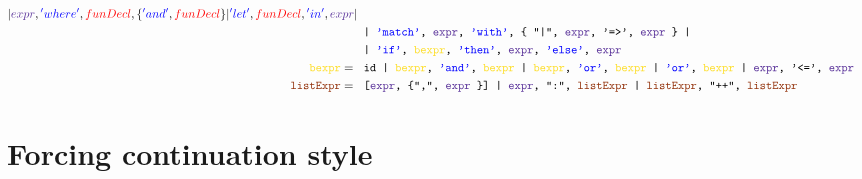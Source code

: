 \documentclass{article}
\begin{document}
\begin{align*}
{	| \color{RoyalPurple}expr\color{black}, \color{blue}'where'\color{black}, \color{red} funDecl\color{black}, \{ \color{blue}'and'\color{black}, \color{red}funDecl \color{black} \} 
	| \color{blue}'let'\color{black}, \color{red}funDecl\color{black}, \color{blue}'in'\color{black}, \color{RoyalPurple}expr \color{black} 
|}\\
&\texttt{
	| \color{blue}'match'\color{black}, \color{RoyalPurple}expr\color{black}, \color{blue}'with'\color{black}, \{ "|", \color{RoyalPurple}expr\color{black}, '=>', \color{RoyalPurple}expr \color{black} \}
|}\\
&\texttt{
	| \color{blue}'if'\color{black}, \color{Goldenrod}bexpr\color{black}, \color{blue}'then'\color{black}, \color{RoyalPurple}expr\color{black}, \color{blue}'else'\color{black}, \color{RoyalPurple}expr\color{black}
}\\
\texttt{\color{Goldenrod}bexpr\color{black}} =\ &\texttt{
	id
	| \color{Goldenrod}bexpr\color{black}, \color{blue}'and'\color{black}, \color{Goldenrod}bexpr \color{black}
	| \color{Goldenrod}bexpr\color{black}, \color{blue} 'or'\color{black}, \color{Goldenrod}bexpr \color{black}
	| \color{blue} 'or'\color{black}, \color{Goldenrod}bexpr \color{black} 
	| \color{RoyalPurple}expr\color{black}, '<=', \color{RoyalPurple}expr\color{black}
}\\
\texttt{\color{RawSienna}listExpr\color{black}} =\ &\texttt{
	[\color{RoyalPurple}expr\color{black}, \{",", \color{RoyalPurple}expr \color{black}\}]
	| \color{RoyalPurple} expr\color{black}, ":", \color{RawSienna}listExpr \color{black}
	| \color{RawSienna}listExpr\color{black}, "++", \color{RawSienna}listExpr \color{black}
}
\end{align*}
\section{Forcing continuation style}
\end{document}

